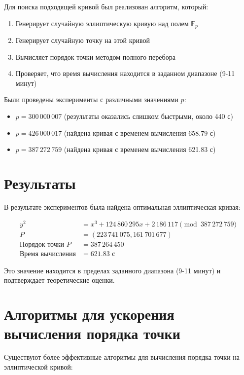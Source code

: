 \documentclass[a4paper,12pt]{article}
\begin{document}
Для поиска подходящей кривой был реализован алгоритм, который:
\begin{enumerate}
    \item Генерирует случайную эллиптическую кривую над полем $\mathbb{F}_p$
    \item Генерирует случайную точку на этой кривой
    \item Вычисляет порядок точки методом полного перебора
    \item Проверяет, что время вычисления находится в заданном диапазоне (9-11 минут)
\end{enumerate}

Были проведены эксперименты с различными значениями $p$:
\begin{itemize}
    \item $p = 300\,000\,007$ (результаты оказались слишком быстрыми, около 440 с)
    \item $p = 426\,000\,017$ (найдена кривая с временем вычисления 658.79 с)
    \item $p = 387\,272\,759$ (найдена кривая с временем вычисления 621.83 с)
\end{itemize}

\section{Результаты}

В результате экспериментов была найдена оптимальная эллиптическая кривая:

\begin{align}
y^2 &= x^3 + 124\,860\,295 x + 2\,186\,117 \pmod{387\,272\,759} \\
P &= (223\,741\,075, 161\,701\,677) \\
\text{Порядок точки } P &= 387\,264\,450 \\
\text{Время вычисления} &= 621.83 \text{ с}
\end{align}

Это значение находится в пределах заданного диапазона (9-11 минут) и подтверждает теоретические оценки.

\section{Алгоритмы для ускорения вычисления порядка точки}

Существуют более эффективные алгоритмы для вычисления порядка точки на эллиптической кривой:
\end{document}
